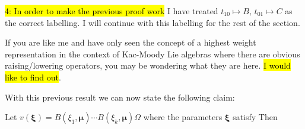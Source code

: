 \documentclass{article}
\begin{document}
\begin{remark}
\hl{4: In order to make the previous proof work} I have treated $t_{10}\mapsto B, \, t_{01} \mapsto C$ as the correct labelling. I will continue with this labelling for the rest of the section.  
\end{remark}

\begin{remark}
If you are like me and have only seen the concept of a highest weight representation in the context of Kac-Moody Lie algebras where there are obvious raising/lowering operators, you may be wondering what they are here. \hl{I would like to find out}.  
\end{remark}

With this previous result we can now state the following claim:

\begin{prop}
Let $v(\bm{\xi}) = B(\xi_1,\bm{\mu}) \cdots B(\xi_k,\bm{\mu})\Omega$ where the parameters $\bm{\xi}$ satisfy 
Then 
\end{prop}
\end{document}
